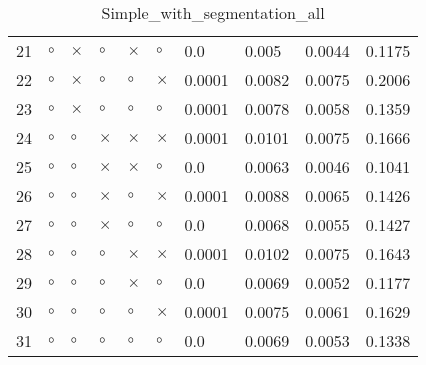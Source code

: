 \begin{table}[H]
\begin{tabular}{|P{0.7cm}|P{1.3cm}P{1.3cm}P{1.3cm}P{1.3cm}P{1.3cm}|P{1.1cm}P{1.1cm}P{1.1cm}P{1.1cm}|}
  21 &  $\circ$ & $\times$ &  $\circ$ &     $\times$ &     $\circ$ &          0.0 &           0.005 &          0.0044 &          0.1175 \\
  22 &  $\circ$ & $\times$ &  $\circ$ &      $\circ$ &    $\times$ &       0.0001 &          0.0082 &          0.0075 &          0.2006 \\
  23 &  $\circ$ & $\times$ &  $\circ$ &      $\circ$ &     $\circ$ &       0.0001 &          0.0078 &          0.0058 &          0.1359 \\
  24 &  $\circ$ &  $\circ$ & $\times$ &     $\times$ &    $\times$ &       0.0001 &          0.0101 &          0.0075 &          0.1666 \\
  25 &  $\circ$ &  $\circ$ & $\times$ &     $\times$ &     $\circ$ &          0.0 &          0.0063 &          0.0046 &          0.1041 \\
  26 &  $\circ$ &  $\circ$ & $\times$ &      $\circ$ &    $\times$ &       0.0001 &          0.0088 &          0.0065 &          0.1426 \\
  27 &  $\circ$ &  $\circ$ & $\times$ &      $\circ$ &     $\circ$ &          0.0 &          0.0068 &          0.0055 &          0.1427 \\
  28 &  $\circ$ &  $\circ$ &  $\circ$ &     $\times$ &    $\times$ &       0.0001 &          0.0102 &          0.0075 &          0.1643 \\
  29 &  $\circ$ &  $\circ$ &  $\circ$ &     $\times$ &     $\circ$ &          0.0 &          0.0069 &          0.0052 &          0.1177 \\
  30 &  $\circ$ &  $\circ$ &  $\circ$ &      $\circ$ &    $\times$ &       0.0001 &          0.0075 &          0.0061 &          0.1629 \\
  31 &  $\circ$ &  $\circ$ &  $\circ$ &      $\circ$ &     $\circ$ &          0.0 &          0.0069 &          0.0053 &          0.1338 \\
\hline
\end{tabular}
\caption{Simple_with_segmentation_all}
\label{tab:}
\end{table}
